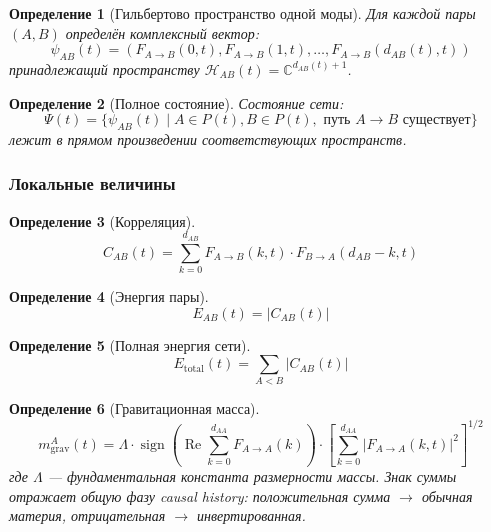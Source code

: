 \documentclass[12pt,a4paper]{article}
\newtheorem{definition}{Определение}[section]
\begin{document}
\begin{definition}[Гильбертово пространство одной моды]
Для каждой пары $(A, B)$ определён комплексный вектор:
\begin{equation}
    \psi_{AB}(t) = (F_{A \to B}(0, t), F_{A \to B}(1, t), \dots, F_{A \to B}(d_{AB}(t), t))
\end{equation}
принадлежащий пространству $\mathcal{H}_{AB}(t) = \mathbb{C}^{d_{AB}(t)+1}$.
\end{definition}

\begin{definition}[Полное состояние]
Состояние сети:
\begin{equation}
    \Psi(t) = \{\psi_{AB}(t) \mid A \in P(t), B \in P(t), \text{ путь } A \to B \text{ существует}\}
\end{equation}
лежит в прямом произведении соответствующих пространств.
\end{definition}

\subsubsection{Локальные величины}

\begin{definition}[Корреляция]
\begin{equation}
    C_{AB}(t) = \sum_{k=0}^{d_{AB}} F_{A \to B}(k, t) \cdot F_{B \to A}(d_{AB} - k, t)
\end{equation}
\end{definition}

\begin{definition}[Энергия пары]
\begin{equation}
    E_{AB}(t) = |C_{AB}(t)|
\end{equation}
\end{definition}

\begin{definition}[Полная энергия сети]
\begin{equation}
    E_{\text{total}}(t) = \sum_{A < B} |C_{AB}(t)|
\end{equation}
\end{definition}

\begin{definition}[Гравитационная масса]
\begin{equation}
    m_{\text{grav}}^A(t) = \Lambda \cdot \operatorname{sign}\!\left(\operatorname{Re} \sum_{k=0}^{d_{AA}} F_{A \to A}(k)\right) \cdot \left[ \sum_{k=0}^{d_{AA}} |F_{A \to A}(k, t)|^2 \right]^{1/2}
\end{equation}
где $\Lambda$ --- фундаментальная константа размерности массы. Знак суммы отражает общую фазу causal history: положительная сумма $\to$ обычная материя, отрицательная $\to$ инвертированная.
\end{definition}
\end{document}
